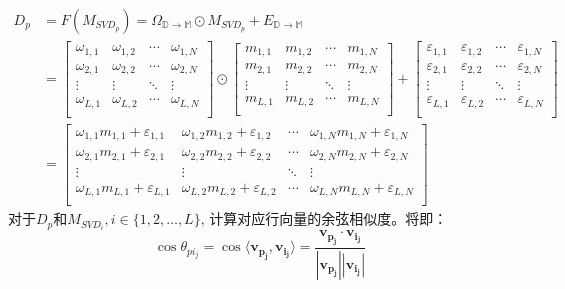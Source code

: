 \documentclass[lang=cn,cite=super]{elegantpaper}
\begin{document}
\begin{equation}
\begin{aligned}
    D_p &= F(M_{SVD_p}) = \Omega_{\mathbb{D}\rightarrow  \mathbb{M}} \odot M_{SVD_p} + E_{\mathbb{D}\rightarrow \mathbb{M}} \\
    &= \begin{bmatrix}
        \omega_{1,1} & \omega_{1,2} & \cdots & \omega_{1,N} \\
        \omega_{2,1} & \omega_{2,2} & \cdots & \omega_{2,N} \\
        \vdots & \vdots & \ddots & \vdots \\
        \omega_{L,1} & \omega_{L,2} & \cdots & \omega_{L,N}\\
    \end{bmatrix} \odot \begin{bmatrix}
        m_{1,1} & m_{1,2} & \cdots & m_{1,N} \\
        m_{2,1} & m_{2,2} & \cdots & m_{2,N} \\
        \vdots & \vdots & \ddots & \vdots \\
        m_{L,1} & m_{L,2} & \cdots & m_{L,N}\\
    \end{bmatrix} + \begin{bmatrix}
        \varepsilon_{1,1} & \varepsilon_{1,2} & \cdots & \varepsilon_{1,N} \\
        \varepsilon_{2,1} & \varepsilon_{2,2} & \cdots & \varepsilon_{2,N} \\
        \vdots & \vdots & \ddots & \vdots \\
        \varepsilon_{L,1} & \varepsilon_{L,2} & \cdots & \varepsilon_{L,N}\\
    \end{bmatrix}\\
    &= \begin{bmatrix}
        \omega_{1,1}m_{1,1}+\varepsilon_{1,1} & \omega_{1,2}m_{1,2}+\varepsilon_{1,2} & \cdots & \omega_{1,N}m_{1,N}+\varepsilon_{1,N} \\
        \omega_{2,1}m_{2,1}+\varepsilon_{2,1} & \omega_{2,2}m_{2,2}+\varepsilon_{2,2} & \cdots & \omega_{2,N}m_{2,N}+\varepsilon_{2,N} \\
        \vdots & \vdots & \ddots & \vdots \\
        \omega_{L,1}m_{L,1}+\varepsilon_{L,1} & \omega_{L,2}m_{L,2}+\varepsilon_{L,2} & \cdots & \omega_{L,N}m_{L,N}+\varepsilon_{L,N}\\
    \end{bmatrix}
\end{aligned}
\end{equation}
对于$D_p$和$M_{SVD_i}, i \in \{ 1,2,\ldots, L\}$, 计算对应行向量的余弦相似度。将即：
\begin{equation}
    \cos \theta_{pi_{j}} = \cos \langle \bm{v_{p_j}},\bm{v_{i_j}} \rangle = \frac{\bm{v_{p_j}} \cdot \bm{v_{i_j}}}{|\bm{v_{p_j}}||\bm{v_{i_j}}|}
\end{equation}
\end{document}
